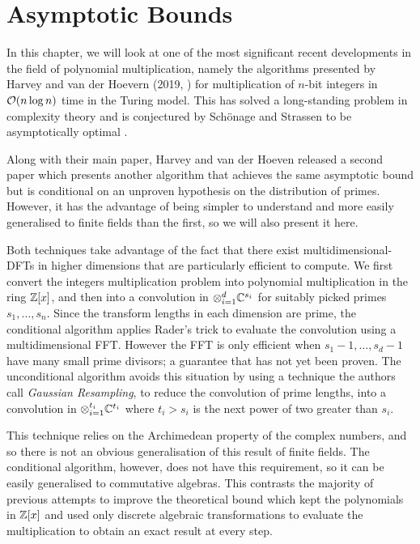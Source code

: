 \chapter{Asymptotic Bounds}\label{chp:asymptotic}

In this chapter, we will look at one of the most significant recent developments in the field of polynomial multiplication, namely the algorithms presented by Harvey and van der Hoevern (2019, \cite{nlogn}) for multiplication of $n$-bit integers in $\mathcal O(n \log n)$ time in the Turing model. This has solved a long-standing problem in complexity theory and is conjectured by Sch\"{o}nage and Strassen to be asymptotically optimal \cite{sch-str-optimality-int-mult}.

\medskip

Along with their main paper, Harvey and van der Hoeven released a second paper \cite{ffnlogn} which presents another algorithm that achieves the same asymptotic bound but is conditional on an unproven hypothesis on the distribution of primes. However, it has the advantage of being simpler to understand and more easily generalised to finite fields than the first, so we will also present it here.

\medskip


Both techniques take advantage of the fact that there exist multidimensional-DFTs in higher dimensions that are particularly efficient to compute. We first convert the integers multiplication problem into polynomial multiplication in the ring ${\mathbb Z}[x]$, and then into a convolution in $\otimes_{i=1}^d {\mathbb C}^{s_i}$ for suitably picked primes $s_1, \ldots, s_n$. Since the transform lengths in each dimension are prime, the conditional algorithm applies Rader's trick to evaluate the convolution using a multidimensional FFT. However the FFT is only efficient when $s_1 - 1, \ldots, s_d - 1$ have many small prime divisors; a guarantee that has not yet been proven. The unconditional algorithm avoids this situation by using a technique the authors call \emph{Gaussian Resampling}, to reduce the convolution of prime lengths, into a convolution in $\otimes_{i=1}^{t_i} {\mathbb C}^{t_i}$ where $t_i > s_i$ is the next power of two greater than $s_i$.

This technique relies on the Archimedean property of the complex numbers, and so there is not an obvious generalisation of this result of finite fields. The conditional algorithm, however, does not have this requirement, so it can be easily generalised to commutative algebras. This contrasts the majority of previous attempts to improve the theoretical bound which kept the polynomials in ${\mathbb Z}[x]$ and used only discrete algebraic transformations to evaluate the multiplication to obtain an exact result at every step.

